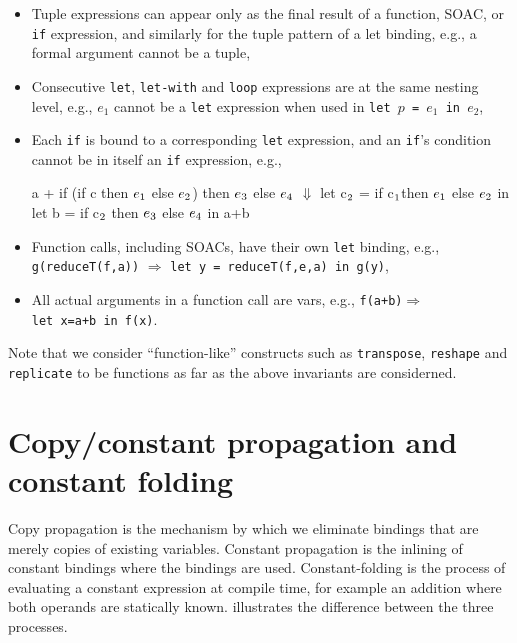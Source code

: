 \begin{itemize}
\item Tuple expressions can appear only as the final result of a
  function, SOAC, or \texttt{if} expression, and similarly for the
  tuple pattern of a let binding, e.g., a formal argument cannot be a
  tuple,
\item Consecutive \texttt{let}, \texttt{let-with} and \texttt{loop}
  expressions are at the same nesting level, e.g., $e_1$ cannot be a
  \texttt{let} expression when used in
  \texttt{let~$p$~=~$e_1$~in~$e_2$},
\item Each \texttt{if} is bound to a corresponding \texttt{let}
  expression, and an \texttt{if}'s condition cannot be in itself an
  \texttt{if} expression, e.g.,
\begin{center}
\begin{colorcode}
a + if (if c then \(e_{1}\) else \(e_{2}\))
    then \(e_{3}\)
    else \(e_{4}\)
  \(\Downarrow\)
let c\(_{2}\) = if c\(_{1}\)then \(e_{1}\) else \(e_{2}\) in
let b = if c\(_{2}\) then \(e_{3}\) else \(e_{4}\) in a+b
\end{colorcode}
\end{center}
\item Function calls, including SOACs, have their own \texttt{let}
  binding, e.g., \texttt{g(reduceT(f,a))} $\Rightarrow$
  \texttt{let~y~=~reduceT(f,e,a)~in~g(y)},
\item All actual arguments in a function call are vars, e.g.,
  \texttt{f(a+b)}$\Rightarrow$\texttt{let~x=a+b~in~f(x)}.
\end{itemize}

Note that we consider ``function-like'' constructs such as
\texttt{transpose}, \texttt{reshape} and \texttt{replicate} to be
functions as far as the above invariants are considerned.

\section{Copy/constant propagation and constant folding}

Copy propagation is the mechanism by which we eliminate bindings that
are merely copies of existing variables.  Constant propagation is the
inlining of constant bindings where the bindings are
used. Constant-folding is the process of evaluating a constant
expression at compile time, for example an addition where both
operands are statically known.
 illustrates the
difference between the three processes.

